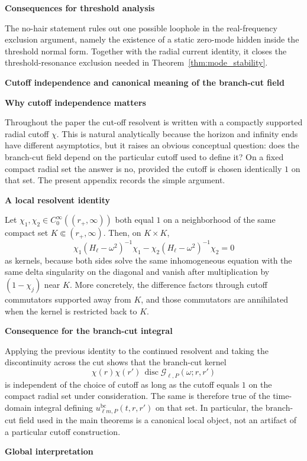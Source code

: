 \documentclass[12pt]{article}
\numberwithin{equation}{section}
\theoremstyle{plain}
\theoremstyle{definition}
\theoremstyle{remark}
\newcommand{\disc}{\operatorname{disc}}
\newcommand{\bc}{\mathrm{bc}}
\newcommand{\cG}{\mathcal G}
\newcommand{\om}{\omega}
\newcommand{\appheading}[1]{\par\medskip\noindent\textbf{#1}\par\smallskip\noindent}
\newcommand{\applabelheading}[2]{\par\medskip\phantomsection\label{#2}\noindent\textbf{#1}\par\smallskip\noindent}
\begin{document}
\appheading{Consequences for threshold analysis}

The no-hair statement rules out one possible loophole in the real-frequency exclusion argument, namely the existence of a static zero-mode hidden inside the threshold normal form.  Together with the radial current identity, it closes the threshold-resonance exclusion needed in Theorem~\ref{thm:mode_stability}.

\applabelheading{Cutoff independence and canonical meaning of the branch-cut field}{app:cutoff_independence}
\appheading{Why cutoff independence matters}

Throughout the paper the cut-off resolvent is written with a compactly supported radial cutoff $\chi$.  This is natural analytically because the horizon and infinity ends have different asymptotics, but it raises an obvious conceptual question: does the branch-cut field depend on the particular cutoff used to define it?  On a fixed compact radial set the answer is no, provided the cutoff is chosen identically $1$ on that set.  The present appendix records the simple argument.

\appheading{A local resolvent identity}

Let $\chi_1,\chi_2\in C_0^\infty((r_+,\infty))$ both equal $1$ on a neighborhood of the same compact set $K\Subset(r_+,\infty)$.  Then, on $K\times K$,
\[
   \chi_1(H_\ell-\om^2)^{-1}\chi_1
   -
   \chi_2(H_\ell-\om^2)^{-1}\chi_2
   =
   0
\]
as kernels, because both sides solve the same inhomogeneous equation with the same delta singularity on the diagonal and vanish after multiplication by $(1-\chi_j)$ near $K$.  More concretely, the difference factors through cutoff commutators supported away from $K$, and those commutators are annihilated when the kernel is restricted back to $K$.

\appheading{Consequence for the branch-cut integral}

Applying the previous identity to the continued resolvent and taking the discontinuity across the cut shows that the branch-cut kernel
\[
   \chi(r)\chi(r')\,\disc\cG_{\ell,P}(\om;r,r')
\]
is independent of the choice of cutoff as long as the cutoff equals $1$ on the compact radial set under consideration.  The same is therefore true of the time-domain integral defining $u_{\ell m,P}^{\bc}(t,r,r')$ on that set.  In particular, the branch-cut field used in the main theorems is a canonical local object, not an artifact of a particular cutoff construction.

\appheading{Global interpretation}
\end{document}
